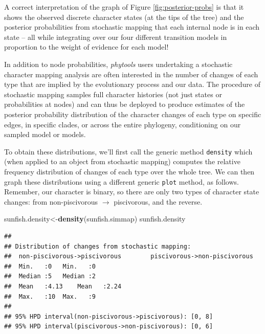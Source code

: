 \documentclass[fleqn,10pt,lineno]{wlpeerj} %
\newenvironment{Shaded}{\begin{snugshade}}{\end{snugshade}}
\newcommand{\FunctionTok}[1]{\textcolor[rgb]{0.13,0.29,0.53}{\textbf{#1}}}
\newcommand{\NormalTok}[1]{#1}
\newcommand{\OtherTok}[1]{\textcolor[rgb]{0.56,0.35,0.01}{#1}}
\begin{document}
A correct interpretation of the graph of Figure \ref{fig:posterior-probs} is that it shows the observed discrete character states (at the tips of the tree) and the posterior probabilities from stochastic mapping that each internal node is in each state -- all while integrating over our four different transition models in proportion to the weight of evidence for each model!

In addition to node probabilities, \emph{phytools} users undertaking a stochastic character mapping analysis are often interested in the number of changes of each type that are implied by the evolutionary process and our data. The procedure of stochastic mapping samples full character histories (not just states or probabilities at nodes) and can thus be deployed to produce estimates of the posterior probability distribution of the character changes of each type on specific edges, in specific clades, or across the entire phylogeny, conditioning on our sampled model or models.

To obtain these distributions, we'll first call the generic method \texttt{density} which (when applied to an object from stochastic mapping) computes the relative frequency distribution of changes of each type over the whole tree. We can then graph these distributions using a different generic \texttt{plot} method, as follows. Remember, our character is binary, so there are only two types of character state changes: from non-piscivorous \(\rightarrow\) piscivorous, and the reverse.

\begin{Shaded}
\begin{Highlighting}[]
\NormalTok{sunfish.density}\OtherTok{\textless{}{-}}\FunctionTok{density}\NormalTok{(sunfish.simmap)}
\NormalTok{sunfish.density}
\end{Highlighting}
\end{Shaded}

\begin{verbatim}
## 
## Distribution of changes from stochastic mapping:
##  non-piscivorous->piscivorous        piscivorous->non-piscivorous
##  Min.   :0   Min.   :0
##  Median :5   Median :2
##  Mean   :4.13    Mean   :2.24
##  Max.   :10  Max.   :9
## 
## 95% HPD interval(non-piscivorous->piscivorous): [0, 8]
## 95% HPD interval(piscivorous->non-piscivorous): [0, 6]
\end{verbatim}
\end{document}
